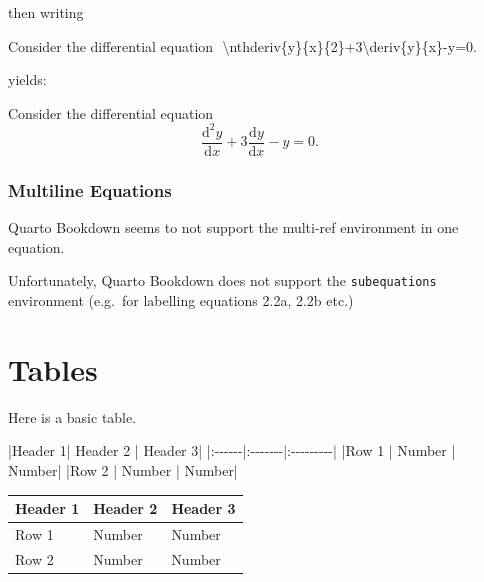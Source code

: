 \documentclass[
  letterpaper,
  oneside]{book}
\newenvironment{Shaded}{\begin{snugshade}}{\end{snugshade}}
\newcommand{\NormalTok}[1]{\textcolor[rgb]{0.00,0.23,0.31}{#1}}
\numberwithin{equation}{section}
\numberwithin{figure}{section}
\theoremstyle{break}
\theoremstyle{plain}
\theoremstyle{remark}
\begin{document}
\newcommand{\rd}{\mathrm{d}}
\newcommand{\deriv}[2]{\frac{\rd #1}{\rd #2}}
\newcommand{\nthderiv}[3]{\frac{\rd^#3 #1}{\rd #2}}

then writing

\begin{Shaded}
\begin{Highlighting}[]
\NormalTok{Consider the differential equation}
\NormalTok{$$}
\NormalTok{\textbackslash{}nthderiv\{y\}\{x\}\{2\}+3\textbackslash{}deriv\{y\}\{x\}{-}y=0.}
\NormalTok{$$}
\end{Highlighting}
\end{Shaded}

yields:

Consider the differential equation \[
\frac{\mathrm{d}^2 y}{\mathrm{d}x}+3\frac{\mathrm{d}y}{\mathrm{d}x}-y=0.
\]

\subsubsection*{Multiline Equations}\label{multiline-equations}

Quarto Bookdown seems to not support the multi-ref environment in one
equation.

Unfortunately, Quarto Bookdown does not support the
\texttt{subequations} environment (e.g.~for labelling equations 2.2a,
2.2b etc.)

\section{Tables}\label{tables}

Here is a basic table.

\begin{Shaded}
\begin{Highlighting}[]
\NormalTok{|Header 1| Header 2 | Header 3|}
\NormalTok{|:{-}{-}{-}{-}{-}{-}|:{-}{-}{-}{-}{-}{-}{-}|:{-}{-}{-}{-}{-}{-}{-}{-}{-}|}
\NormalTok{|Row 1 | Number | Number|}
\NormalTok{|Row 2 | Number | Number|}
\end{Highlighting}
\end{Shaded}

\begin{longtable}[]{@{}lll@{}}
\toprule\noalign{}
Header 1 & Header 2 & Header 3 \\
\midrule\noalign{}
\endhead
\bottomrule\noalign{}
\endlastfoot
Row 1 & Number & Number \\
Row 2 & Number & Number \\
\end{longtable}
\end{document}
